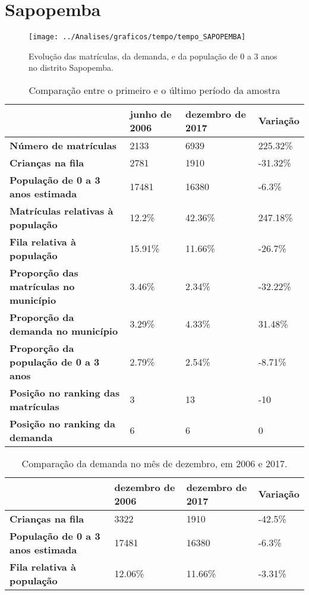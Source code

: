 \section{Sapopemba}
\begin{figure}[H]
\centering
\texttt{[image: ../Analises/graficos/tempo/tempo\_SAPOPEMBA]}
\caption{Evolução das matrículas, da demanda, e da população de 0 a 3 anos no distrito Sapopemba.}
\end{figure}
\begin{table}[H]
\begin{tabular}{|l|l|l|l|}
\hline
\textbf{}                                      & \textbf{junho de 2006}       & \textbf{dezembro de 2017}    & \textbf{Variação} \\ \hline
\textbf{Número de matrículas}                  & 2133 & 6939 & 225.32\% \\ \hline
\textbf{Crianças na fila}                      & 2781 & 1910 & -31.32\% \\ \hline
\textbf{População de 0 a 3 anos estimada}      & 17481 & 16380 & -6.3\% \\ \hline
\textbf{Matrículas relativas à população}      & 12.2\% & 42.36\% & 247.18\% \\ \hline
\textbf{Fila relativa à população}             & 15.91\% & 11.66\% & -26.7\% \\ \hline
\textbf{Proporção das matrículas no município} & 3.46\% & 2.34\% & -32.22\% \\ \hline
\textbf{Proporção da demanda no município}     & 3.29\% & 4.33\% & 31.48\% \\ \hline
\textbf{Proporção da população de 0 a 3 anos}  & 2.79\% & 2.54\% & -8.71\% \\ \hline
\textbf{Posição no ranking das matrículas}     & 3 & 13 & -10 \\ \hline
\textbf{Posição no ranking da demanda}         & 6 & 6 & 0 \\ \hline
\end{tabular}
\caption{Comparação entre o primeiro e o último período da amostra}
\end{table}
\begin{table}[H]
\begin{tabular}{|l|l|l|l|}
\hline
\textbf{}                                 & \textbf{dezembro de 2006} & \textbf{dezembro de 2017} & \textbf{Variação} \\ \hline
\textbf{Crianças na fila}                      & 3322 & 1910 & -42.5\% \\ \hline
\textbf{População de 0 a 3 anos estimada}      & 17481 & 16380 & -6.3\% \\ \hline
\textbf{Fila relativa à população}             & 12.06\% & 11.66\% & -3.31\% \\ \hline
\end{tabular}
\caption{Comparação da demanda no mês de dezembro, em 2006 e 2017.}
\end{table}
